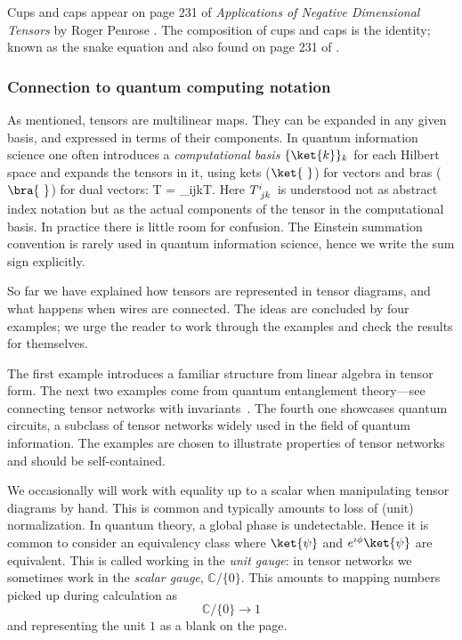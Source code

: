 \begin{remark}
Cups and caps appear on page 231 of {\it Applications of Negative Dimensional Tensors} by Roger Penrose \cite{Penrose}. The composition of cups and caps is the identity; known as the snake equation and also found on page 231 of \cite{Penrose}. 
\end{remark}



\subsubsection*{Connection to quantum computing notation}
As mentioned, tensors are multilinear maps.
They can be expanded in any given basis, and expressed in
terms of their components.
In quantum information science one often introduces a \emph{computational basis}
$\{\ket{k}\}_k$
for each Hilbert space
and expands the tensors in it, using kets ($\ket{~}$) for vectors and bras ($\bra{~}$) for dual vectors:
\be 
T = \sum_{ijk}T.
\ee 
Here $T\indices{^i_{jk}}$ is understood
not as abstract index notation but as the actual components of the
tensor in the computational basis.
In practice there is little room for confusion.
The Einstein summation convention is rarely used in quantum information science,
hence we write the sum sign explicitly.


So far we have explained how tensors are represented in tensor diagrams,
and what happens when wires are connected. The ideas are concluded by four examples; we urge the reader to work through the examples and check the results for themselves.

The first example introduces a familiar structure from linear algebra in tensor form.
The next two examples come from quantum entanglement theory---see connecting
tensor networks with invariants~\cite{BBL11, 2014SIGMA..10..095C}.
The fourth one showcases quantum circuits, a subclass of tensor networks
widely used in the field of quantum information.
The examples are chosen to illustrate properties of tensor networks and should be self-contained.

\begin{remark}
We occasionally will work with equality up to a scalar when manipulating tensor diagrams by hand. This is common and typically amounts to loss of (unit) normalization.  In quantum theory, a global phase is undetectable.  Hence it is common to consider an equivalency class where $\ket{\psi}$ and $e^{\imath \phi}\ket{\psi}$ are equivalent. This is called working in the {\it unit gauge}: in tensor networks we sometimes work in the {\it scalar gauge}, $\mathbb{C}/\{0\}$. This amounts to mapping numbers picked up during calculation as 
$$
\mathbb{C}/\{0\}\rightarrow 1
$$ 
and representing the unit $1$ as a blank on the page. 
\end{remark}

